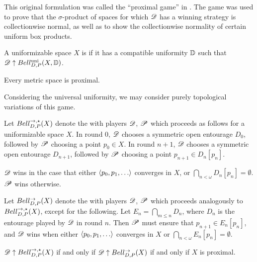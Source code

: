 This original formulation was called the ``proximal game'' in \cite{MR3239205}.
The game was used to prove that the
$\sigma$-product of spaces for which $\mathscr{D}$ has a winning strategy is
collectionwise normal, as well as to show the collectionwise normality
of certain uniform box products.

\begin{defn}
  A uniformizable space $X$ is  if it has a compatible uniformity
  $\mathbb{D}$ such that $\mathscr{D}\uparrow Bell_{D,P}^{\textrm{uni}}(X,\mathbb{D})$.
\end{defn}

\begin{prop}
  Every metric space is proximal.
\end{prop}

Considering the universal uniformity, we may
consider purely topological variations of this game.

\begin{game}
  Let $Bell_{D,P}^{\to,\star}(X)$ denote the  with
  players $\mathscr{D}$, $\mathscr{P}$ which proceeds as follows for
  a uniformizable space $X$. In round $0$,
  $\mathscr{D}$ chooses a symmetric open entourage $D_0$, followed by $\mathscr{P}$
  choosing a point $p_0\in X$. In round $n+1$, $\mathscr{D}$ chooses a symmetric
  open entourage $D_{n+1}$, followed
  by $\mathscr{P}$ choosing a point $p_{n+1}\in D_n[p_n]$.

  $\mathscr{D}$ wins in the case that either $\<p_0,p_1,\dots\>$ converges in $X$,
  or $\bigcap_{n<\omega}D_n[p_n] = \emptyset$. $\mathscr{P}$ wins otherwise.
\end{game}

\begin{game}
  Let $Bell_{D,P}^{\to}(X)$ denote the  with players $\mathscr{D}$,
  $\mathscr{P}$ which proceeds analogously to $Bell_{D,P}^{\to,\star}(X)$, except for the
  following. Let $E_n=\bigcap_{m\leq n}D_n$, where $D_n$ is the entourage played
  by $\mathscr{D}$ in round $n$.
  Then $\mathscr{P}$ must ensure that $p_{n+1}\in E_n[p_n]$,
  and $\mathscr{D}$ wins when either $\<p_0,p_1,\dots\>$ converges in $X$
  or $\bigcap_{n<\omega}E_n[p_n] = \emptyset$.
\end{game}

\begin{thm}
  $\mathscr{D}\uparrow Bell_{D,P}^{\to,\star}(X)$ if and only if
  $\mathscr{D}\uparrow Bell_{D,P}^{\to}(X)$ if and only if
  $X$ is proximal.
\end{thm}

